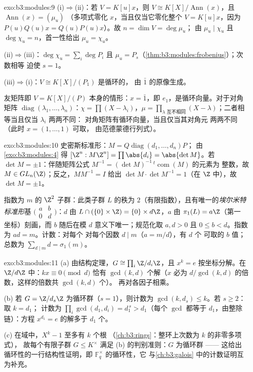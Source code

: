 \begin{solution}{exo:b3:modules:9}
(i)$\Rightarrow$(ii)：若 $V = K[u]x$，则 $V \cong
K[X]/\operatorname{Ann}(x)$，且 $\operatorname{Ann}(x) = (\mu_u)$
（多项式零化 $x$，当且仅当它零化整个 $V = K[u]x$，因为
$P(u)Q(u)x = Q(u)P(u)x$）。故 $n = \dim V = \deg \mu_u$；
由 $\mu_u \mid \chi_u$ 且 $\deg\chi_u = n$，首一性给出 $\mu_u =
\chi_u$。

(ii)$\Rightarrow$(iii)：$\deg\chi_u = \sum_i \deg P_i$ 且
$\mu_u = P_s$（\cref{thm:b3:modules:frobenius}）；次数相等
迫使 $s = 1$。

(iii)$\Rightarrow$(i)：$V \cong K[X]/(P_1)$ 是循环的，
由 $\bar 1$ 的原像生成。

友矩阵即 $V = K[X]/(P)$ 本身的情形：$x = \bar
1$，即 $e_1$，是循环向量。对于对角矩阵
$\operatorname{diag}(\lambda_1, \dots, \lambda_n)$：$\chi = \prod
(X - \lambda_i)$，$\mu = \prod_{\lambda \text{ 互不相同}} (X -
\lambda)$；二者相等当且仅当 $\lambda_i$ 两两不同：
对角矩阵有循环向量，当且仅当其对角元
两两不同（此时 $x = (1, \dots, 1)$ 可取，
由范德蒙德行列式）。
\end{solution}

\begin{solution}{exo:b3:modules:10}
史密斯标准形：$M = Q\operatorname{diag}(d_1,\dots,d_n)P$；
由\cref{exo:b3:modules:4} 得 $[\Z^n : M\Z^n] = \prod\abs{d_i} =
\abs{\det M}$。若 $\det M = \pm 1$：伴随矩阵公式
$M^{-1} = (\det M)^{-1}\,{}^{t}\!\operatorname{com}(M)$ 的元素为
整数，故 $M \in GL_n(\Z)$；反之，$MM^{-1} = I$
给出 $\det M \cdot \det M^{-1} = 1$（在 $\Z$ 中），故 $\det M = \pm1$。

指数为 $m$ 的 $\Z^2$ 子群：此类子群 $L$ 的秩为
$2$（有限指数），且有唯一的\emph{埃尔米特
标准形}基 $\bigl(\begin{smallmatrix} a & b\\ 0 &
d\end{smallmatrix}\bigr)$：$d$ 由 $L \cap (\{0\}
\times \Z) = \{0\} \times d\Z$，$a$ 由 $\pi_1(L) = a\Z$（第一
坐标）刻画，而 $b$ 随后在模 $d$ 意义下唯一；规范化取 $a, d
> 0$ 且 $0 \leq b < d$。指数为 $ad = m$。计数：对每个
对每个因数 $d \mid m$（$a = m/d$），有 $d$ 个
可取的 $b$ 值；总数为 $\sum_{d \mid m} d = \sigma_1(m)$。
\end{solution}

\begin{solution}{exo:b3:modules:11}
(a) 由结构定理，$G \cong \prod_i\Z/d_i\Z$，且
$x^k = e$ 按坐标分解。在 $\Z/d\Z$ 中：$kx \equiv 0
\pmod d$ 恰有 $\gcd(k, d)$ 个解（$x$ 必为
$d/\gcd(k,d)$ 的倍数，这样的倍数共 $\gcd(k, d)$ 个）。
再对各因子相乘。

(b) 若 $G = \Z/d_s\Z$ 为循环群（$s = 1$），则计数为
$\gcd(k, d_s) \leq k$。若 $s \geq 2$：取 $k = d_1$；
计数为 $\prod_i\gcd(d_1, d_i) = d_1^{\,s} > d_1$（每个
$\gcd$ 都等于 $d_1$，由整除链）：方程
$x^{d_1} = e$ 的解多于 $d_1$ 个。

(c) 在域中，$X^k - 1$ 至多有 $k$ 个根
（\cref{ch:b3:rings}：整环上次数为 $k$ 的非零多项式），
故每个有限子群 $G \leq K^\times$
满足 (b) 的判别准则：$G$ 为循环群 —— 这给出
循环性的一行结构性证明，即
$\mathbb F_q^\times$ 的循环性，它
与\cref{ch:b3:galois} 中的计数证明互为补充。
\end{solution}

